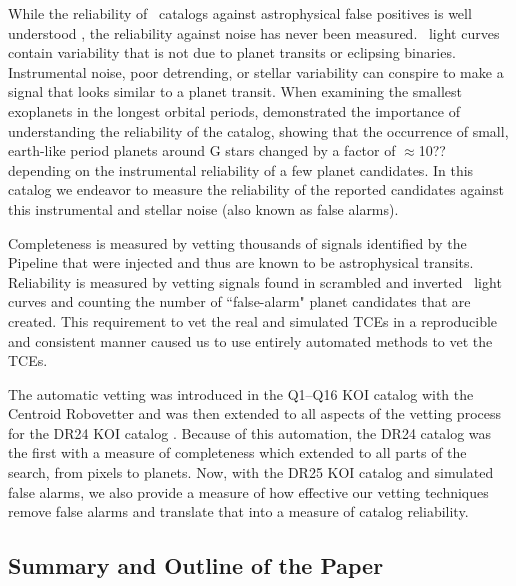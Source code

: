 While the reliability of \Kepler\ catalogs against astrophysical false positives is well understood \citet[see e.g.][]{Morton2016,Torres2012}, the reliability against noise has never been measured.  \Kepler\ light curves contain variability that is not due to planet transits or eclipsing binaries.  Instrumental noise, poor detrending, or stellar variability can conspire to make a signal that looks similar to a planet transit. When examining the smallest exoplanets in the longest orbital periods, \citet{Burke2015} demonstrated the importance of understanding the reliability of the catalog, showing that the occurrence of small, earth-like period planets around G stars changed by a factor of $\approx$10?? depending on the instrumental reliability of a few planet candidates.  In this catalog we endeavor to measure the reliability of the reported candidates against this instrumental and stellar noise (also known as false alarms).  


Completeness is measured by vetting thousands of signals identified by the \Kepler Pipeline that were injected and thus are known to be astrophysical transits. Reliability is measured by vetting signals found in scrambled and inverted \Kepler\ light curves and counting the number of ``false-alarm" planet candidates that are created. This requirement to vet the real and simulated TCEs in a reproducible and consistent manner caused us to use entirely automated methods to vet the TCEs.  

The automatic vetting was introduced in the Q1--Q16 KOI catalog \citep{Mullally2015cat} with the Centroid Robovetter and was then extended to all aspects of the vetting process for the DR24 KOI catalog \citep{Coughlin2016}. Because of this automation, the DR24 catalog was the first with a measure of completeness which extended to all parts of the search, from pixels to planets.  Now, with the DR25 KOI catalog and simulated false alarms, we also provide a measure of how effective our vetting techniques remove false alarms and translate that into a measure of catalog reliability.

\subsection{Summary and Outline of the Paper}

